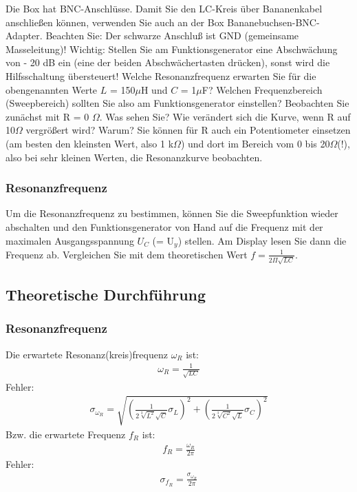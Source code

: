 \documentclass[12pt]{scrartcl}
\begin{document}

Die Box hat BNC-Anschlüsse. Damit Sie den LC-Kreis über Bananenkabel anschließen können, verwenden Sie auch an der Box Bananebuchsen-BNC-Adapter. Beachten Sie: Der schwarze Anschluß ist GND (gemeinsame
Masseleitung)! Wichtig: Stellen Sie am Funktionsgenerator eine Abschwächung von - 20 dB ein (eine der beiden Abschwächertasten drücken), sonst wird die Hilfsschaltung übersteuert! Welche Resonanzfrequenz erwarten Sie für die obengenannten Werte
$L$ = 150$\mu$H und $C$ = 1$\mu$F? Welchen Frequenzbereich (Sweepbereich) sollten Sie also am Funktionsgenerator einstellen?
Beobachten Sie zunächst mit R = 0
$\Omega$. Was sehen Sie? Wie verändert sich die Kurve, wenn R auf 10$\Omega$ vergrößert wird? Warum? Sie können für R auch ein Potentiometer einsetzen (am besten den kleinsten Wert, also 1 k$\Omega$) und dort im Bereich vom 0 bis 20$\Omega$(!), also bei sehr kleinen Werten, die Resonanzkurve beobachten.
\subsubsection{Resonanzfrequenz}
Um die Resonanzfrequenz zu bestimmen, können Sie die Sweepfunktion wieder abschalten und den Funktionsgenerator von Hand auf die Frequenz mit der maximalen Ausgangsspannung
$U_C$ (= U$_y$) stellen. Am Display lesen Sie dann die Frequenz ab. Vergleichen Sie mit dem theoretischen Wert
$f = \frac{1}{2 \Pi \sqrt{LC}}$.
\subsection{Theoretische Durchführung}
\subsubsection{Resonanzfrequenz}
Die erwartete Resonanz(kreis)frequenz $\omega_R$ ist:
\begin{align}
\omega_R = \frac{1}{\sqrt{LC}}
\end{align}
Fehler:
\begin{align}
\sigma_{\omega_R} = \sqrt{
\left(\frac{1}{2\sqrt[3]{L^2}\sqrt{C}}\sigma_L\right)^2+
\left(\frac{1}{2\sqrt[3]{C^2}\sqrt{L}}\sigma_C\right)^2}
\end{align}
Bzw. die erwartete Frequenz $f_R$ ist:
\begin{align}
f_R = \frac{\omega_R}{2\pi}
\end{align}
Fehler:
\begin{align}
\sigma_{f_R} = \frac{\sigma_{\omega_R}}{2 \pi}
\end{align}
\end{document}
